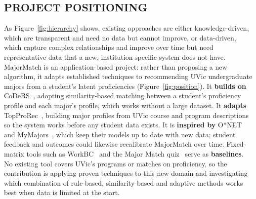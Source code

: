 \documentclass[sigconf]{acmart}
\begin{document}
\subsection{PROJECT POSITIONING}
As Figure~\ref{fig:hierarchy} shows, existing approaches are either knowledge-driven, which are transparent and need no data but cannot improve, or data-driven, which capture complex relationships and improve over time but need representative data that a new, institution-specific system does not have. MajorMatch is an application-based project: rather than proposing a new algorithm, it adapts established techniques to recommending UVic undergraduate majors from a student's latent proficiencies (Figure~\ref{fig:position}). It \textbf{builds on} CoDeRS~\cite{rances}, adopting similarity-based matching between a student's proficiency profile and each major's profile, which works without a large dataset. It \textbf{adapts} TopProRec~\cite{hill}, building major profiles from UVic course and program descriptions so the system works before any student data exists. It is \textbf{inspired by} O*NET~\cite{javalagi} and MyMajors~\cite{mymajors}, which keep their models up to date with new data; student feedback and outcomes could likewise recalibrate MajorMatch over time. Fixed-matrix tools such as WorkBC~\cite{workbc} and the Major Match quiz~\cite{majormatch} serve as \textbf{baselines}. No existing tool covers UVic's programs or matches on proficiency, so the contribution is applying proven techniques to this new domain and investigating which combination of rule-based, similarity-based and adaptive methods works best when data is limited at the start.
\end{document}
